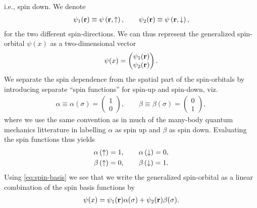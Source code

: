         i.e., spin down.  We denote
        \begin{align}
            \psi_1(\mathbf{r}) \equiv \psi\left( \mathbf{r}, \uparrow \right),
            \qquad
            \psi_2(\mathbf{r}) \equiv \psi\left( \mathbf{r}, \downarrow \right),
        \end{align}
        for the two different spin-directions. We can thus represent the
        generalized spin-orbital $\psi(x)$ as a two-dimensional vector
        \begin{align}
            \psi(x) = \begin{pmatrix}
                \psi_1(\mathbf{r}) \\
                \psi_2(\mathbf{r})
            \end{pmatrix}.
        \end{align}
        We separate the spin dependence from the spatial part of the
        spin-orbitals by introducing separate ``spin functions'' for spin-up and
        spin-down, viz.
        \begin{align}
            \alpha \equiv \alpha(\sigma) = \begin{pmatrix}
                1 \\
                0
            \end{pmatrix},
            \qquad
            \beta \equiv \beta(\sigma) = \begin{pmatrix}
                0 \\
                1
            \end{pmatrix},
            \label{eq:spin-basis}
        \end{align}
        where we use the same convention as in much of the many-body quantum
        mechanics litterature in labelling $\alpha$ as spin up and $\beta$ as
        spin down. Evaluating the spin functions thus yields
        \begin{gather}
            \alpha\left( \uparrow \right) = 1, \qquad \alpha\left( \downarrow \right) = 0, \\
            \beta\left( \uparrow \right) = 0, \qquad \beta\left( \downarrow \right) = 1.
        \end{gather}
        Using \autoref{eq:spin-basis} we see that we write the
        generalized spin-orbital as a linear combination of the spin basis
        functions by
        \begin{align}
            \psi(x)
            = \psi_1(\mathbf{r})\alpha(\sigma)
            + \psi_2(\mathbf{r})\beta(\sigma).
        \end{align}



